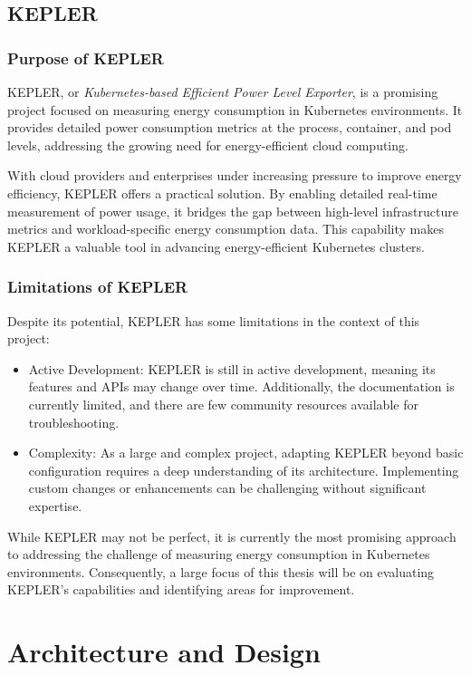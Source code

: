 \subsection{KEPLER}

\subsubsection{Purpose of KEPLER}
KEPLER, or \textit{Kubernetes-based Efficient Power Level Exporter}, is a promising project focused on measuring energy consumption in Kubernetes environments. It provides detailed power consumption metrics at the process, container, and pod levels, addressing the growing need for energy-efficient cloud computing.

With cloud providers and enterprises under increasing pressure to improve energy efficiency, KEPLER offers a practical solution. By enabling detailed real-time measurement of power usage, it bridges the gap between high-level infrastructure metrics and workload-specific energy consumption data. This capability makes KEPLER a valuable tool in advancing energy-efficient Kubernetes clusters.

\subsubsection{Limitations of KEPLER}

Despite its potential, KEPLER has some limitations in the context of this project:
\begin{itemize}
\item Active Development: KEPLER is still in active development, meaning its features and APIs may change over time. Additionally, the documentation is currently limited, and there are few community resources available for troubleshooting.
\item Complexity: As a large and complex project, adapting KEPLER beyond basic configuration requires a deep understanding of its architecture. Implementing custom changes or enhancements can be challenging without significant expertise.
\end{itemize}

While KEPLER may not be perfect, it is currently the most promising approach to addressing the challenge of measuring energy consumption in Kubernetes environments. Consequently, a large focus of this thesis will be on evaluating KEPLER's capabilities and identifying areas for improvement.

\section{Architecture and Design}

